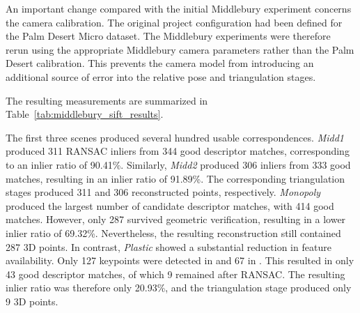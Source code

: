 An important change compared with the initial Middlebury experiment concerns
the camera calibration. The original project configuration had been defined
for the Palm Desert Micro dataset. The Middlebury experiments were therefore
rerun using the appropriate Middlebury camera parameters rather than the
Palm Desert calibration. This prevents the camera model from introducing an
additional source of error into the relative pose and triangulation stages.

The resulting measurements are summarized in
Table~\ref{tab:middlebury_sift_results}.

\begin{table}[H]
\centering
\caption{Results of the SIFT-based pairwise reconstruction on the Middlebury scenes.}
\label{tab:middlebury_sift_results}
\end{table}

The first three scenes produced several hundred usable correspondences.
\textit{Midd1} produced 311 RANSAC inliers from 344 good descriptor matches,
corresponding to an inlier ratio of 90.41\%. Similarly, \textit{Midd2} produced
306 inliers from 333 good matches, resulting in an inlier ratio of 91.89\%.
The corresponding triangulation stages produced 311 and 306 reconstructed
points, respectively.
\textit{Monopoly} produced the largest number of candidate descriptor
matches, with 414 good matches. However, only 287 survived geometric
verification, resulting in a lower inlier ratio of 69.32\%. Nevertheless, the
resulting reconstruction still contained 287 3D points.
In contrast, \textit{Plastic} showed a substantial reduction in feature
availability. Only 127 keypoints were detected in  and 67 in
. This resulted in only 43 good descriptor matches, of which
9 remained after RANSAC. The resulting inlier ratio was therefore only
20.93\%, and the triangulation stage produced only 9 3D points.

